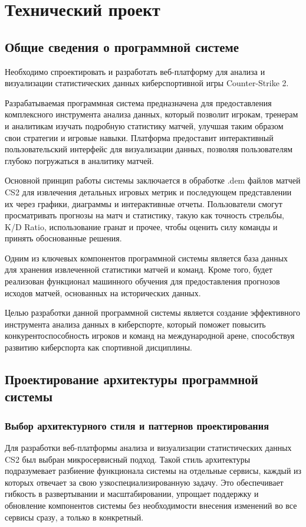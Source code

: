 \newsection
\section{Технический проект}
\subsection{Общие сведения о программной системе}

Необходимо спроектировать и разработать веб-платформу для анализа и визуализации статистических данных киберспортивной игры Counter-Strike 2.

Разрабатываемая программная система предназначена для предоставления комплексного инструмента анализа данных, который позволит игрокам, тренерам и аналитикам изучать подробную статистику матчей, улучшая таким образом свои стратегии и игровые навыки. Платформа предоставит интерактивный пользовательский интерфейс для визуализации данных, позволяя пользователям глубоко погружаться в аналитику матчей.

Основной принцип работы системы заключается в обработке .dem файлов матчей CS2 для извлечения детальных игровых метрик и последующем представлении их через графики, диаграммы и интерактивные отчеты. Пользователи смогут просматривать прогнозы на матч и статистику, такую как точность стрельбы, K/D Ratio, использование гранат и прочее, чтобы оценить силу команды и принять обоснованные решения.

Одним из ключевых компонентов программной системы является база данных для хранения извлеченной статистики матчей и команд. Кроме того, будет реализован функционал машинного обучения для предоставления прогнозов исходов матчей, основанных на исторических данных.

Целью разработки данной программной системы является создание эффективного инструмента анализа данных в киберспорте, который поможет повысить конкурентоспособность игроков и команд на международной арене, способствуя развитию киберспорта как спортивной дисциплины.


\subsection{Проектирование архитектуры программной системы}
\subsubsection{Выбор архитектурного стиля и паттернов проектирования}
Для разработки веб-платформы анализа и визуализации статистических данных CS2 был выбран микросервисный подход. Такой стиль архитектуры подразумевает разбиение функционала системы на отдельные сервисы, каждый из которых отвечает за свою узкоспециализированную задачу. Это обеспечивает гибкость в развертывании и масштабировании, упрощает поддержку и обновление компонентов системы без необходимости внесения изменений во все сервисы сразу, а только в конкретный.

